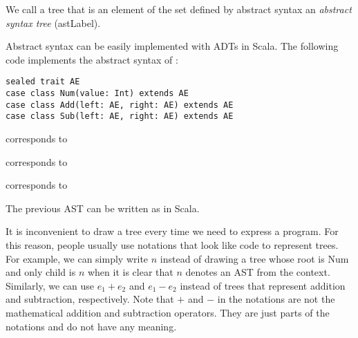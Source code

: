 We call a tree that is an element of the set defined by abstract syntax an
\textit{abstract syntax tree} (\acrshort{astLabel}).

Abstract syntax can be easily implemented with ADTs in Scala. The following code
implements the abstract syntax of \lang:

\begin{verbatim}
sealed trait AE
case class Num(value: Int) extends AE
case class Add(left: AE, right: AE) extends AE
case class Sub(left: AE, right: AE) extends AE
\end{verbatim}

 corresponds to

\begin{center}
\end{center}

 corresponds to

\begin{center}
\end{center}

 corresponds to

\begin{center}
\end{center}

The previous AST can be written as  in Scala.

It is inconvenient to draw a tree every time we need to express a program. For
this reason, people usually use notations that look like code to represent
trees. For example, we can simply write $n$ instead of drawing a tree whose root
is Num and only child is $n$ when it is clear that $n$ denotes an AST
from the context. Similarly, we can use $e_1+e_2$ and $e_1-e_2$
instead of trees that represent addition and subtraction, respectively. Note that
$+$ and $-$ in the notations are not the mathematical addition and subtraction
operators. They are just parts of the notations and do not have any meaning.

